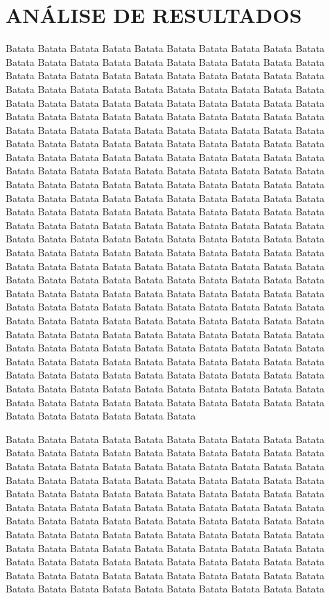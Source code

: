 \section{ANÁLISE DE RESULTADOS}
\vspace{0.5cm}

Batata Batata Batata Batata Batata Batata Batata Batata Batata Batata Batata Batata 
    Batata Batata Batata Batata Batata Batata Batata Batata Batata Batata Batata Batata 
    Batata Batata Batata Batata Batata Batata Batata Batata Batata Batata Batata Batata 
    Batata Batata Batata Batata Batata Batata Batata Batata Batata Batata Batata Batata 
    Batata Batata Batata Batata Batata Batata Batata Batata Batata Batata Batata Batata 
    Batata Batata Batata Batata Batata Batata Batata Batata Batata Batata Batata Batata 
    Batata Batata Batata Batata Batata Batata Batata Batata Batata Batata Batata Batata 
    Batata Batata Batata Batata Batata Batata Batata Batata Batata Batata Batata Batata 
    Batata Batata Batata Batata Batata Batata Batata Batata Batata Batata Batata Batata 
    Batata Batata Batata Batata Batata Batata Batata Batata Batata Batata Batata Batata 
    Batata Batata Batata Batata Batata Batata Batata Batata Batata Batata Batata Batata 
    Batata Batata Batata Batata Batata Batata Batata Batata Batata Batata Batata Batata 
    Batata Batata Batata Batata Batata Batata Batata Batata Batata Batata Batata Batata 
    Batata Batata Batata Batata Batata Batata Batata Batata Batata Batata Batata Batata 
    Batata Batata Batata Batata Batata Batata Batata Batata Batata Batata Batata Batata 
    Batata Batata Batata Batata Batata Batata Batata Batata Batata Batata Batata Batata 
    Batata Batata Batata Batata Batata Batata Batata Batata Batata Batata Batata Batata 
    Batata Batata Batata Batata Batata Batata Batata Batata Batata Batata Batata Batata 
    Batata Batata Batata Batata Batata Batata Batata Batata Batata Batata Batata Batata 
    Batata Batata Batata Batata Batata Batata Batata Batata Batata Batata Batata Batata 
    Batata Batata Batata Batata Batata Batata Batata Batata Batata Batata Batata Batata 
    Batata Batata Batata Batata Batata Batata Batata Batata Batata Batata Batata Batata 
    Batata Batata Batata Batata Batata Batata Batata Batata Batata Batata Batata Batata 
    
    Batata Batata Batata Batata Batata Batata Batata Batata Batata Batata Batata Batata 
    Batata Batata Batata Batata Batata Batata Batata Batata Batata Batata Batata Batata 
    Batata Batata Batata Batata Batata Batata Batata Batata Batata Batata Batata Batata 
    Batata Batata Batata Batata Batata Batata Batata Batata Batata Batata Batata Batata 
    Batata Batata Batata Batata Batata Batata Batata Batata Batata Batata Batata Batata 
    Batata Batata Batata Batata Batata Batata Batata Batata Batata Batata Batata Batata 
    Batata Batata Batata Batata Batata Batata Batata Batata Batata Batata Batata Batata 
    Batata Batata Batata Batata Batata Batata Batata Batata Batata Batata Batata Batata 
    Batata Batata Batata Batata Batata Batata Batata Batata Batata Batata Batata Batata 
    Batata Batata Batata Batata Batata Batata Batata Batata Batata Batata Batata Batata 
